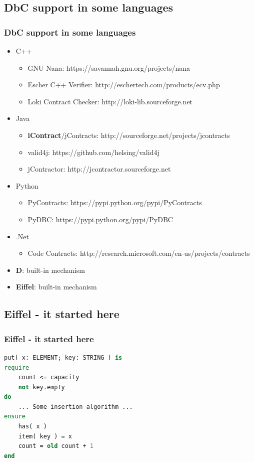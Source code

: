 \documentclass{beamer}
\begin{document}
\subsection{DbC support in some languages}
\begin{frame}
\frametitle{DbC support in some languages}
\begin{itemize}
  \item C++
  \begin{itemize}
    \item GNU Nana: https://savannah.gnu.org/projects/nana
    \item Escher C++ Verifier: http://eschertech.com/products/ecv.php
    \item Loki Contract Checker: http://loki-lib.sourceforge.net
  \end{itemize}
  \item Java
  \begin{itemize}
    \item \textbf{iContract}/jContracts: http://sourceforge.net/projects/jcontracts
    \item valid4j: https://github.com/helsing/valid4j
    \item jContractor: http://jcontractor.sourceforge.net
  \end{itemize}
  \item Python
  \begin{itemize}
    \item PyContracts: https://pypi.python.org/pypi/PyContracts
    \item PyDBC: https://pypi.python.org/pypi/PyDBC
  \end{itemize}
  \item .Net
  \begin{itemize}
    \item Code Contracts: http://research.microsoft.com/en-us/projects/contracts
  \end{itemize}
  \item \textbf{D}: built-in mechanism
  \item \textbf{Eiffel}: built-in mechanism
\end{itemize}
\end{frame}

\subsection{Eiffel - it started here}
\begin{frame}[fragile]
\frametitle{Eiffel - it started here}
\begin{lstlisting}[language=Eiffel,caption=http://www.open-std.org/jtc1/sc22/wg21/docs/papers/2004/n1613.pdf]
put( x: ELEMENT; key: STRING ) is
require
    count <= capacity
    not key.empty
do
    ... Some insertion algorithm ...
ensure
    has( x )
    item( key ) = x
    count = old count + 1
end
\end{lstlisting}
\end{frame}
\end{document}
